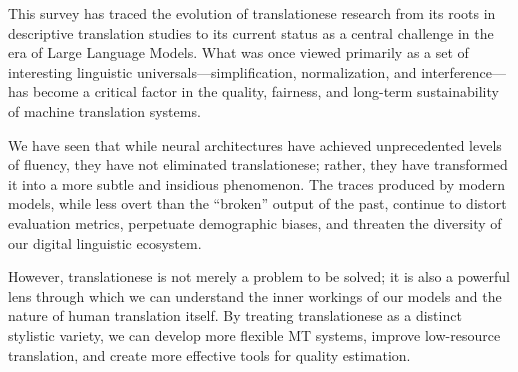 \documentclass[11pt,a4paper]{article}
\begin{document}
This survey has traced the evolution of translationese research from its roots in descriptive translation studies to its current status as a central challenge in the era of Large Language Models. What was once viewed primarily as a set of interesting linguistic universals—simplification, normalization, and interference—has become a critical factor in the quality, fairness, and long-term sustainability of machine translation systems.

We have seen that while neural architectures have achieved unprecedented levels of fluency, they have not eliminated translationese; rather, they have transformed it into a more subtle and insidious phenomenon. The traces produced by modern models, while less overt than the ``broken'' output of the past, continue to distort evaluation metrics, perpetuate demographic biases, and threaten the diversity of our digital linguistic ecosystem.

However, translationese is not merely a problem to be solved; it is also a powerful lens through which we can understand the inner workings of our models and the nature of human translation itself. By treating translationese as a distinct stylistic variety, we can develop more flexible MT systems, improve low-resource translation, and create more effective tools for quality estimation.
\end{document}
